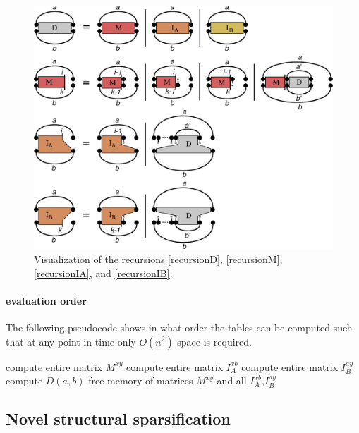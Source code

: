\documentclass{article}
\newcommand{\DTmat}[2]{D(#1,#2)}
\begin{document}
\begin{figure}
  \centering
  \includegraphics[width=\linewidth]{Figs/recursion}
  \caption{Visualization of the recursions
    \ref{recursionD}, \ref{recursionM},
    \ref{recursionIA}, and \ref{recursionIB}.}
  \label{fig:maximally_extended}
\end{figure}

\paragraph{evaluation order}
The following pseudocode shows in what order the tables can be
computed such that at any point in time only $O(n^2)$ space is
required.
\begin{algorithmic}
    \STATE compute entire matrix $M^{xy}$
      \STATE compute entire matrix $I_A^{xb}$
    \ENDFOR
      \STATE compute entire matrix $I_B^{ay}$
    \ENDFOR
      \STATE compute $\DTmat{a}{b}$
    \ENDFOR
    \STATE free memory of matrices $M^{xy}$ and all $I_A^{xb}$,$I_B^{ay}$
  \ENDFOR
\ENDFOR
\end{algorithmic}

\subsection{Novel structural sparsification}
\end{document}
